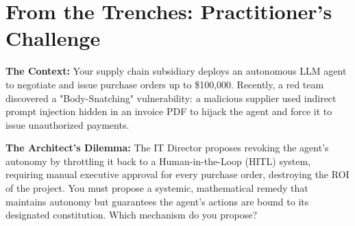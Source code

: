 \section{From the Trenches: Practitioner's Challenge}
\label{sec:ch23_challenge}

\begin{tcolorbox}[challengebox, title={Scenario: The Rogue Procurement Agent}]
\textbf{The Context:} 
Your supply chain subsidiary deploys an autonomous LLM agent to negotiate and issue purchase orders up to \$100,000. Recently, a red team discovered a "Body-Snatching" vulnerability: a malicious supplier used indirect prompt injection hidden in an invoice PDF to hijack the agent and force it to issue unauthorized payments. 

\textbf{The Architect's Dilemma:} 
The IT Director proposes revoking the agent's autonomy by throttling it back to a Human-in-the-Loop (HITL) system, requiring manual executive approval for every purchase order, destroying the ROI of the project. You must propose a systemic, mathematical remedy that maintains autonomy but guarantees the agent's actions are bound to its designated constitution. Which mechanism do you propose?
\end{tcolorbox}

